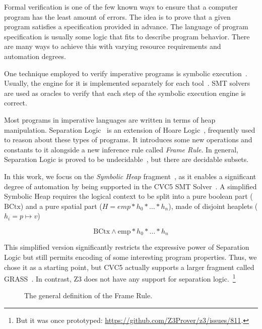 \documentclass[sigplan,screen,review]{acmart}
\begin{document}
Formal verification is one of the few known ways to ensure that a computer program has the least amount of errors. The idea is to prove that a given program satisfies a specification provided in advance. The language of program specification is usually some logic that fits to describe program behavior. There are many ways to achieve this with varying resource requirements and automation degrees.

One technique employed to verify imperative programs is symbolic execution~\cite{berdine2005symbolic}. Usually, the engine for it is implemented separately for each tool~\cite{DBLP:conf/fmco/BerdineCO05,DBLP:conf/oopsla/DistefanoP08}. SMT solvers are used as oracles to verify that each step of the symbolic execution engine is correct. 

Most programs in imperative languages are written in terms of heap manipulation. Separation Logic~\cite{DBLP:journals/cacm/OHearn19} is an extension of Hoare Logic~\cite{DBLP:journals/cacm/Hoare69}, frequently used to reason about these types of programs. It introduces some new operations and constants to it alongside a new inference rule called \emph{Frame Rule}. In general, Separation Logic is proved to be undecidable~\cite{DBLP:conf/lics/BrotherstonK10}, but there are decidable subsets.

In this work, we focus on the \emph{Symbolic Heap} fragment~\cite{DBLP:conf/fmco/BerdineCO05}, as it enables a significant degree of automation by being supported in the CVC5 SMT Solver~\cite{DBLP:conf/tacas/BarbosaBBKLMMMN22}. A simplified Symbolic Heap requires the logical context to be split into a pure boolean part ($\mbox{BCtx}$) and a pure spatial part ($H = emp * h_0 * \dots * h_n$), made of disjoint heaplets ($h_i = p \mapsto v$)

\[
\text{BCtx} \wedge \text{emp} * h_0 * \dots * h_n
\]

This simplified version significantly restricts the expressive power of Separation Logic but still permits encoding of some interesting program properties. Thus, we chose it as a starting point, but CVC5 actually supports a larger fragment called GRASS~\cite{DBLP:conf/cav/PiskacWZ13}. In contrast, Z3\cite{DBLP:conf/tacas/MouraB08} does not have any support for separation logic.~\footnote{But it was once prototyped: \url{https://github.com/Z3Prover/z3/issues/811}.} 

\begin{figure}
\begin{prooftree}
\end{prooftree}
\caption{The general definition of the Frame Rule.}
\label{fig:framerule}
\end{figure}
\end{document}
